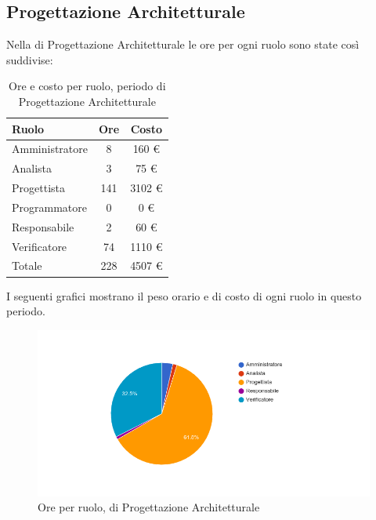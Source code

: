 \subsection{Progettazione Architetturale}
Nella  di Progettazione Architetturale le ore per ogni ruolo sono state cos\`i suddivise:

\begin{table}[H]
	\centering
	\begin{tabular}{ l c c }
		\textbf{Ruolo} & \textbf{Ore} & \textbf{Costo} \\
		\hline
		Amministratore & 8 & 160 \euro{} \\
		Analista & 3 & 75 \euro{} \\
		Progettista & 141 & 3102 \euro{} \\
		Programmatore & 0 & 0 \euro{} \\
		Responsabile & 2 & 60 \euro{} \\
		Verificatore & 74 & 1110 \euro{} \\
		\hline
		Totale & 228 & 4507 \euro{} \\
		\hline
	\end{tabular}
	\caption{Ore e costo per ruolo, periodo di Progettazione Architetturale}
\end{table}

I seguenti grafici mostrano il peso orario e di costo di ogni ruolo in questo periodo.

\begin{figure}[H]
  \begin{center}
    \includegraphics[width=15cm]{res/img/prospettoEconomico/orePerRuoloProgettazioneArchitetturale.png}
  \caption{Ore per ruolo,  di Progettazione Architetturale}
  \end{center} 
\end{figure}  


